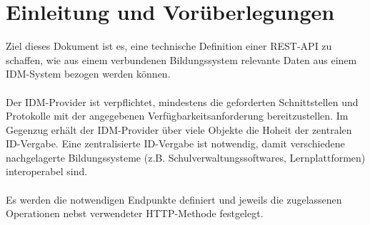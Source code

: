 \chapter{Einleitung und Vorüberlegungen}
Ziel dieses Dokument ist es, eine technische Definition einer REST-API zu schaffen, wie aus einem verbundenen Bildungssystem relevante Daten aus einem IDM-System bezogen werden können.\\
\\
Der IDM-Provider ist verpflichtet, mindestens die geforderten Schnittstellen und Protokolle mit der angegebenen Verfügbarkeitsanforderung bereitzustellen. 
Im Gegenzug erhält der IDM-Provider über viele Objekte die Hoheit der zentralen ID-Vergabe. 
Eine zentralisierte ID-Vergabe ist notwendig, damit verschiedene nachgelagerte Bildungssysteme (z.B. Schulverwaltungssoftwares, Lernplattformen) interoperabel sind.\\
\\
Es werden die notwendigen Endpunkte definiert und jeweils die zugelassenen Operationen nebst verwendeter HTTP-Methode festgelegt.

